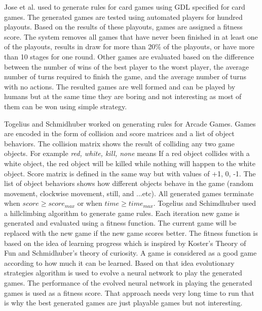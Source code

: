 Jose et al.\cite{generationCardGames} used  to generate rules for card games using GDL specified for card games. The generated games are tested using automated players for hundred playouts. Based on the results of these playouts, games are assigned a fitness score. The system removes all games that have never been finished in at least one of the playouts, results in draw for more than 20\% of the playouts, or have more than 10 stages for one round. Other games are evaluated based on the difference between the number of wins of the best player to the worst player, the average number of turns required to finish the game, and the average number of turns with no actions. The resulted games are well formed and can be played by humans but at the same time they are boring and not interesting as most of them can be won using simple strategy.\\\par

Togelius and Schmidhuber\cite{arcadeHillClimber} worked on generating rules for Arcade Games. Games are encoded in the form of collision and score matrices and a list of object behaviors. The collision matrix shows the result of colliding any two game objects. For example \emph{red, white, kill, none} means If a red object collides with a white object, the red object will be killed while nothing will happen to the white object. Score matrix is defined in the same way but with values of +1, 0, -1. The list of object behaviors shows how different objects behave in the game (random movement, clockwise movement, still, and ...etc). All generated games terminate when $score \geq score_{max}$ or when $time \geq time_{max}$. Togelius and Schimdhuber used a hillclimbing algorithm to generate game rules. Each iteration new game is generated and evaluated using a fitness function. The current game will be replaced with the new game if the new game scores better. The fitness function is based on the idea of learning progress which is inspired by Koster's Theory of Fun\cite{theoryFun} and Schmidhuber's theory of curiosity\cite{theoryCuriousity}. A game is considered as a good game according to how much it can be learned. Based on that idea evolutionary strategies algorithm is used to evolve a neural network to play the generated games. The performance of the evolved neural network in playing the generated games is used as a fitness score. That approach needs  very long time to run that is why the best generated games are just playable games but not interesting.\\\par

